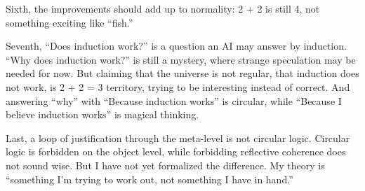 Sixth, the improvements should add up to normality: 2 + 2 is still 4, not something exciting like ``fish.''

Seventh, ``Does induction work?'' is a question an AI may answer by induction. ``Why does induction work?'' is still a mystery, where strange speculation may be needed for now. But claiming that the universe is not regular, that induction does not work, is 2 + 2 = 3 territory, trying to be interesting instead of correct. And answering ``why'' with ``Because induction works'' is circular, while ``Because I believe induction works'' is magical thinking. 

Last, a loop of justification through the meta-level is not circular logic. Circular logic is forbidden on the object level, while forbidding reflective coherence does not sound wise. But I have not yet formalized the difference. My theory is ``something I'm trying to work out, not something I have in hand.'' 
